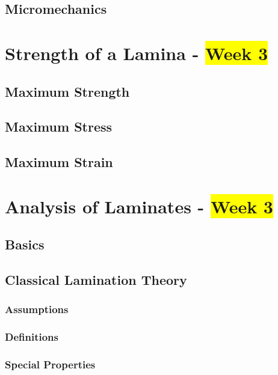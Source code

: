 \documentclass[11pt]{article}
\begin{document}
    \subsection{Micromechanics}

    \section{Strength of a Lamina - \colorbox{Yellow}{Week 3}}

    \subsection{Maximum Strength}

    \subsection{Maximum Stress}

    \subsection{Maximum Strain}

    \section{Analysis of Laminates - \colorbox{Yellow}{Week 3}}

    \subsection{Basics}

    \subsection{Classical Lamination Theory}

    \subsubsection{Assumptions}

    \subsubsection{Definitions}

    \subsubsection{Special Properties}
\end{document}
